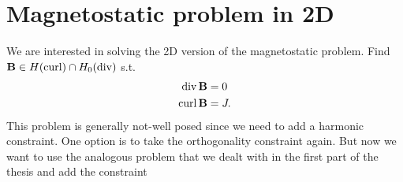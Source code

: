 \documentclass[../master_thesis.tex]{subfiles}
\begin{document}
\section{Magnetostatic problem in 2D}

We are interested in solving the 2D version of the magnetostatic problem. 
Find $\mathbf{B} \in H(\operatorname{curl}) \cap H_0(\operatorname{div})$ s.t.
\begin{align*}
    \operatorname{div} \mathbf{B} &= 0
    \\ \operatorname{curl} \mathbf{B} &= J.
\end{align*}
This problem is generally not-well posed since we need to add a harmonic constraint. 
One option is to take the orthogonality constraint again. But now we want to use the 
analogous problem that we dealt with in the first part of the thesis and add the 
constraint 
\end{document}
